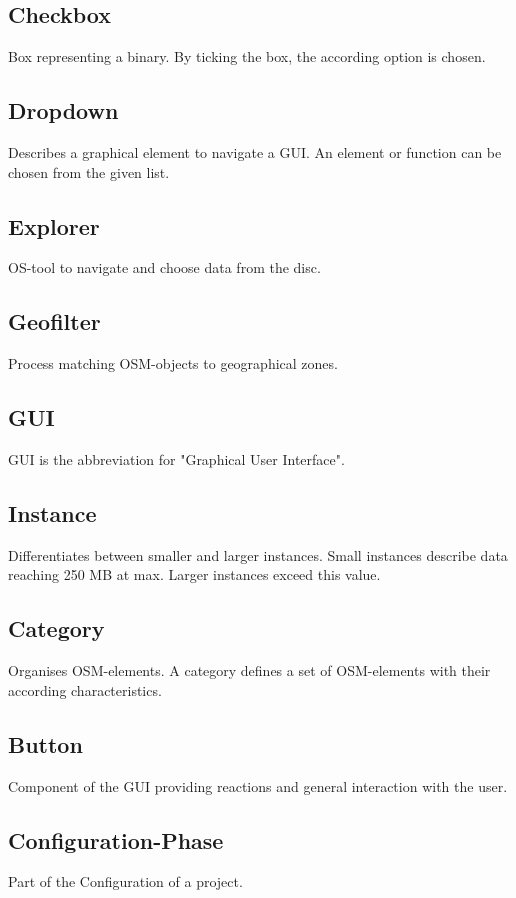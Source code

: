 \documentclass[parskip=full]{scrartcl} %
\begin{document}
\subsection*{Checkbox}
Box representing a binary. By ticking the box, the according option is chosen.

\subsection*{Dropdown}
Describes a graphical element to navigate a GUI. An element or function can be chosen from the given list.

\subsection*{Explorer}
OS-tool to navigate and choose data from the disc.

\subsection*{Geofilter}
Process matching OSM-objects to geographical zones.

\subsection*{GUI}
GUI is the abbreviation for "Graphical User Interface".

\subsection*{Instance}
Differentiates between smaller and larger instances. Small instances describe data reaching 250 MB at max. Larger instances exceed this value.

\subsection*{Category}
Organises OSM-elements. A category defines a set of OSM-elements with their according characteristics.

\subsection*{Button}
Component of the GUI providing reactions and general interaction with the user.

\subsection*{Configuration-Phase}
Part of the Configuration of a project.
\end{document}
